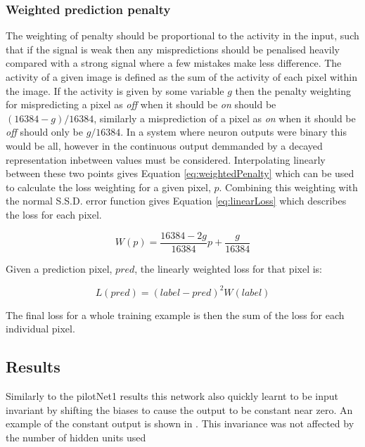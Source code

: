 \subsubsection{Weighted prediction penalty}
The weighting of penalty should be proportional to the activity in the input, such that if the signal is weak then any mispredictions should be penalised heavily compared with a strong signal where a few mistakes make less difference. 
The activity of a given image is defined as the sum of the activity of each pixel within the image.
If the activity is given by some variable $g$ then the penalty weighting for mispredicting a pixel as \textit{off} when it should be \textit{on} should be $(16384 - g) / 16384$, similarly a misprediction of a pixel as \textit{on} when it should be \textit{off} should only be $g / 16384$. 
In a system where neuron outputs were binary this would be all, however in the continuous output demmanded by a decayed representation inbetween values must be considered.
Interpolating linearly between these two points gives Equation \ref{eq:weightedPenalty} which can be used to calculate the loss weighting for a given pixel, $p$.
Combining this weighting with the normal S.S.D. error function gives Equation \ref{eq:linearLoss} which describes the loss for each pixel. 

\begin{equation}
    \label{eq:weightedPenalty}
    W(p) = \frac{16384 - 2g}{16384} p + \frac{g}{16384}
\end{equation}

Given a prediction pixel, $pred$, the linearly weighted loss for that pixel is:

\begin{equation}
    \label{eq:linearLoss}
    L(pred) = (label - pred)^2 W(label)
\end{equation}

The final loss for a whole training example is then the sum of the loss for each individual pixel. 

\subsection{Results} 
Similarly to the pilotNet1 results this network also quickly learnt to be input invariant by shifting the biases to cause the output to be constant near zero. 
An example of the constant output is shown in . 
This invariance was not affected by the number of hidden units used

